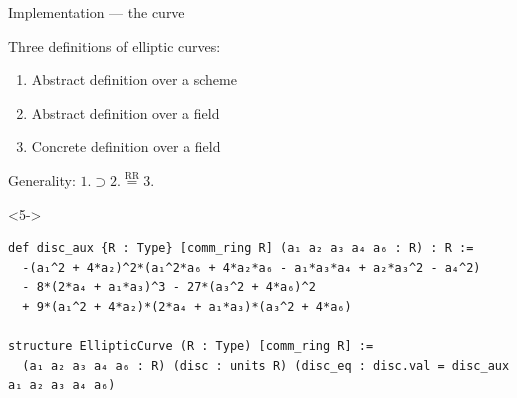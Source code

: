 \documentclass[10pt]{beamer}
\begin{document}
\begin{frame}[fragile, t]{Implementation --- the curve}

Three definitions of elliptic curves:
\begin{enumerate}
\item Abstract definition over a scheme
\item Abstract definition over a field
\item Concrete definition over a field
\end{enumerate}
Generality: $ 1. \supset 2. \overset{\text{RR}}{=} 3. $

\begin{onlyenv}<5->
\begin{lstlisting}[basicstyle=\scriptsize, frame=single]
def disc_aux {R : Type} [comm_ring R] (a₁ a₂ a₃ a₄ a₆ : R) : R :=
  -(a₁^2 + 4*a₂)^2*(a₁^2*a₆ + 4*a₂*a₆ - a₁*a₃*a₄ + a₂*a₃^2 - a₄^2)
  - 8*(2*a₄ + a₁*a₃)^3 - 27*(a₃^2 + 4*a₆)^2
  + 9*(a₁^2 + 4*a₂)*(2*a₄ + a₁*a₃)*(a₃^2 + 4*a₆)

structure EllipticCurve (R : Type) [comm_ring R] :=
  (a₁ a₂ a₃ a₄ a₆ : R) (disc : units R) (disc_eq : disc.val = disc_aux a₁ a₂ a₃ a₄ a₆)
\end{lstlisting}
\end{onlyenv}


\end{frame}
\end{document}
